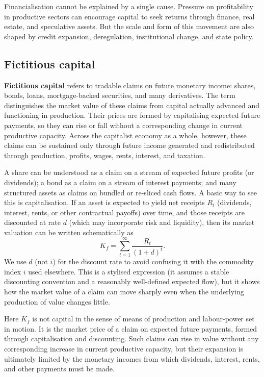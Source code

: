 Financialisation cannot be explained by a single cause. Pressure on profitability in productive sectors can encourage capital to seek returns through finance, real estate, and speculative assets. But the scale and form of this movement are also shaped by credit expansion, deregulation, institutional change, and state policy.

\subsection{Fictitious capital}
\label{sec:fictitious-capital}

\textbf{Fictitious capital} refers to tradable claims on future monetary income:
shares, bonds, loans, mortgage-backed securities, and many derivatives. The term
distinguishes the market value of these claims from capital actually advanced and
functioning in production. Their prices are formed by capitalising expected future
payments, so they can rise or fall without a corresponding change in current productive
capacity. Across the capitalist economy as a whole, however, these claims can be
sustained only through future income generated and redistributed through production,
profits, wages, rents, interest, and taxation.\cite{HarveyNewImperialism}

A share can be understood as a claim on a stream of expected future profits (or dividends);
a bond as a claim on a stream of interest payments; and many structured assets as claims on
bundled or re-sliced cash flows. A basic way to see this is capitalisation. If an asset is
expected to yield net receipts $R_t$ (dividends, interest, rents, or other contractual payoffs)
over time, and those receipts are discounted at rate $d$ (which may incorporate risk and liquidity),
then its market valuation can be written schematically as
\begin{equation}
  K_f = \sum_{t=1}^{\infty} \frac{R_t}{(1+d)^t}.
  \label{eq:fictitious-capitalisation}
\end{equation}
We use $d$ (not $i$) for the discount rate to avoid confusing it with the commodity index $i$
used elsewhere. This is a stylised expression (it assumes a stable discounting convention and a
reasonably well-defined expected flow), but it shows how the market value of a claim can move sharply even when the
underlying production of value changes little.

Here \(K_f\) is not capital in the sense of means of production and
labour-power set in motion. It is the market price of a claim on expected
future payments, formed through capitalisation and discounting. Such claims
can rise in value without any corresponding increase in current productive
capacity, but their expansion is ultimately limited by the monetary incomes
from which dividends, interest, rents, and other payments must be made.

